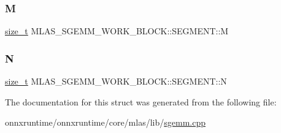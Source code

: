 \subsubsection{\texorpdfstring{M}{M}}
{\footnotesize\ttfamily \mbox{\hyperlink{mlasi_8h_a503efbc1c6e50825320ad909366b78ab}{size\+\_\+t}} M\+L\+A\+S\+\_\+\+S\+G\+E\+M\+M\+\_\+\+W\+O\+R\+K\+\_\+\+B\+L\+O\+C\+K\+::\+S\+E\+G\+M\+E\+N\+T\+::M}

\mbox{\label{structMLAS__SGEMM__WORK__BLOCK_1_1SEGMENT_a7103b18d1b873908c7d27312352262ee}} 
\subsubsection{\texorpdfstring{N}{N}}
{\footnotesize\ttfamily \mbox{\hyperlink{mlasi_8h_a503efbc1c6e50825320ad909366b78ab}{size\+\_\+t}} M\+L\+A\+S\+\_\+\+S\+G\+E\+M\+M\+\_\+\+W\+O\+R\+K\+\_\+\+B\+L\+O\+C\+K\+::\+S\+E\+G\+M\+E\+N\+T\+::N}



The documentation for this struct was generated from the following file\+:\begin{DoxyCompactItemize}
\item 
onnxruntime/onnxruntime/core/mlas/lib/\mbox{\hyperlink{sgemm_8cpp}{sgemm.\+cpp}}\end{DoxyCompactItemize}
